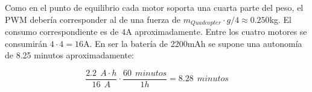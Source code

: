 \documentclass[twoside,11pt]{book}
\begin{document}
\begin{figure}[ht]
\begin{center}
\end{center}
\end{figure}

Como en el punto de equilibrio cada motor soporta una cuarta parte del peso, el PWM debería corresponder al de una fuerza de $m_{Quadcopter}\cdot g/4\approx0.250$kg. El consumo correspondiente es de $4$A aproximadamente. Entre los cuatro motores se consumirán $4 \cdot 4=16$A. En ser la batería de 2200mAh se supone una autonomía de 8.25 minutos aproximadamente:

\begin{equation}
\frac{2.2 \>\> A \cdot h}{16\>\>A} \cdot \frac{60\>\> minutos}{1 h}=8.28 \>\> minutos
\end{equation} 
\end{document}
